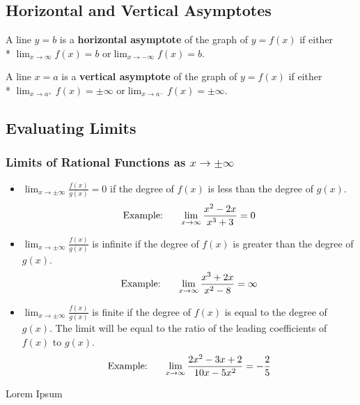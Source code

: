 \documentclass{artikel3}
\begin{document}
\subsection{Horizontal and Vertical Asymptotes}
A line $y=b$ is a \textbf{horizontal asymptote} of the graph of $y=f(x)$ if either\\*
$\displaystyle\lim_{x \to \infty}f(x)=b \text{ or} \lim_{x \to -\infty}f(x)=b$.

A line $x=a$ is a \textbf{vertical asymptote} of the graph of $y=f(x)$ if either\\*
$\displaystyle\lim_{x \to a^+}f(x)=\pm\infty \text{ or} \lim_{x \to a^-}f(x)=\pm\infty$.

\subsection{Evaluating Limits}

\subsubsection{Limits of Rational Functions as $x \to \pm\infty$}
\begin{itemize}
\item{$\displaystyle\lim_{x \to \pm\infty}\frac{f(x)}{g(x)}=0$ if the degree
of $f(x)$ is less than the degree of $g(x)$.
\[ \text{Example:}\hspace{6 mm}\lim_{x \to \infty}\frac{x^2-2x}{x^3+3}=0 \]}
\item{$\displaystyle\lim_{x \to \pm\infty}\frac{f(x)}{g(x)}$ is infinite if the degree
of $f(x)$ is greater than the degree of $g(x)$.
\[ \text{Example:}\hspace{6 mm}\lim_{x \to \infty}\frac{x^3+2x}{x^2-8}=\infty \]}
\item{$\displaystyle\lim_{x \to \pm\infty}\frac{f(x)}{g(x)}$ is finite if the degree 
of $f(x)$ is equal to the degree of $g(x)$. The limit will be equal to the ratio of 
the leading coefficients of $f(x)$ to $g(x)$.
\[ \text{Example:}\hspace{6 mm}\lim_{x \to \infty}\frac{2x^2-3x+2}{10x-5x^2}=-\frac{2}{5} \]}
\end{itemize}

Lorem Ipsum
\end{document}
